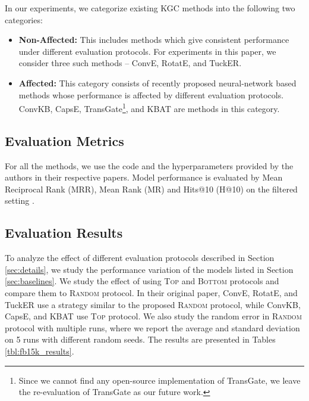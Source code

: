 \documentclass[11pt,a4paper]{article}
\begin{document}
In our experiments, we categorize existing KGC methods into the following two categories:

\begin{itemize}[itemsep=2pt,parsep=2pt,partopsep=0pt,leftmargin=*,topsep=4pt]
	\item \textbf{Non-Affected:} This includes methods which give consistent performance under different evaluation protocols. For experiments in this paper, we consider three such methods --
	ConvE, RotatE, and TuckER.
	\item \textbf{Affected:} This category consists of recently proposed neural-network based methods whose performance is affected by different evaluation protocols. ConvKB, CapsE, TransGate\footnote{Since we cannot find any open-source implementation of TransGate, we leave the re-evaluation of TransGate as our future work.}, and KBAT are methods in this category.
\end{itemize}




\subsection{Evaluation Metrics}
\label{sec:evaluation_metrics}

For all the methods, we use the code and the hyperparameters provided by the authors in their respective papers. 
Model performance is evaluated by Mean Reciprocal Rank (MRR), Mean Rank (MR) and Hits@10 (H@10) on the filtered setting \cite{transe}.
 \subsection{Evaluation Results}
\label{sec:results}








\label{sec:results_evaluation}
To analyze the effect of different evaluation protocols described in Section \ref{sec:details}, we study the performance variation of the models listed in Section \ref{sec:baselines}. We study the effect of using \textsc{Top} and \textsc{Bottom} protocols and compare them to \textsc{Random} protocol. In their original paper, ConvE, RotatE, and TuckER use a strategy similar to the proposed \textsc{Random} protocol, while ConvKB, CapsE, and KBAT use \textsc{Top} protocol. We also study the random error in \textsc{Random} protocol with multiple runs, where we report the average and standard deviation on 5 runs with different random seeds. The results are presented in Tables \ref{tbl:fb15k_results}.
\end{document}
